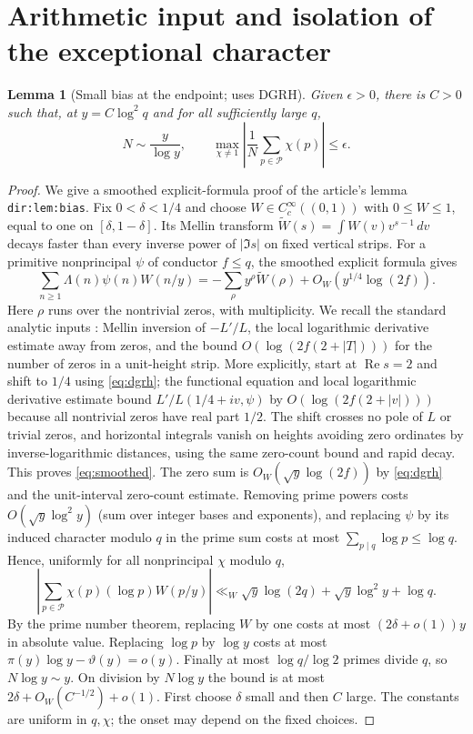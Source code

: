 \documentclass[11pt]{article}
\newtheorem{lemma}[theorem]{Lemma}
\theoremstyle{remark}\newtheorem{remark}[theorem]{Remark}
\newcommand{\Pool}{\mathcal P}
\newcommand{\abs}[1]{\left|#1\right|}
\newcommand{\Rea}{\operatorname{Re}}
\begin{document}
\section{Arithmetic input and isolation of the exceptional character}
\begin{lemma}[Small bias at the endpoint; uses DGRH]\label{lem:bias}
Given $\epsilon>0$, there is $C>0$ such that, at $y=C\log^2 q$ and for all sufficiently large $q$,
\[
 N\sim\frac{y}{\log y},\qquad
 \max_{\chi\ne1}\abs{\frac1N\sum_{p\in\Pool}\chi(p)}\le\epsilon.
\]
\end{lemma}
\begin{proof}
We give a smoothed explicit-formula proof of the article's lemma \texttt{dir:lem:bias}. Fix $0<\delta<1/4$ and choose $W\in C_c^\infty((0,1))$ with $0\le W\le1$, equal to one on $[\delta,1-\delta]$. Its Mellin transform $\widetilde W(s)=\int W(v)v^{s-1}\,dv$ decays faster than every inverse power of $|\Im s|$ on fixed vertical strips. For a primitive nonprincipal $\psi$ of conductor $f\le q$, the smoothed explicit formula gives
\begin{equation}\label{eq:smoothed}
 \sum_{n\ge1}\Lambda(n)\psi(n)W(n/y)
 =-\sum_{\rho}y^\rho\widetilde W(\rho)+O_W(y^{1/4}\log(2f)).
\end{equation}
Here $\rho$ runs over the nontrivial zeros, with multiplicity. We recall the standard analytic inputs \cite[Chs.~10, 12--13]{MV}: Mellin inversion of $-L'/L$, the local logarithmic derivative estimate away from zeros, and the bound $O(\log(2f(2+|T|)))$ for the number of zeros in a unit-height strip. More explicitly, start at $\Rea s=2$ and shift to $1/4$ using \eqref{eq:dgrh}; the functional equation and local logarithmic derivative estimate bound $L'/L(1/4+iv,\psi)$ by $O(\log(2f(2+|v|)))$ because all nontrivial zeros have real part $1/2$. The shift crosses no pole of $L$ or trivial zeros, and horizontal integrals vanish on heights avoiding zero ordinates by inverse-logarithmic distances, using the same zero-count bound and rapid decay. This proves \eqref{eq:smoothed}. The zero sum is $O_W(\sqrt y\log(2f))$ by \eqref{eq:dgrh} and the unit-interval zero-count estimate. Removing prime powers costs $O(\sqrt y\log^2 y)$ (sum over integer bases and exponents), and replacing $\psi$ by its induced character modulo $q$ in the prime sum costs at most $\sum_{p\mid q}\log p\le\log q$. Hence, uniformly for all nonprincipal $\chi$ modulo $q$,
\[
 \abs{\sum_{p\in\Pool}\chi(p)(\log p) W(p/y)}
 \ll_W \sqrt y\log(2q)+\sqrt y\log^2 y+\log q.
\]
By the prime number theorem, replacing $W$ by one costs at most $(2\delta+o(1))y$ in absolute value. Replacing $\log p$ by $\log y$ costs at most $\pi(y)\log y-\vartheta(y)=o(y)$. Finally at most $\log q/\log 2$ primes divide $q$, so $N\log y\sim y$. On division by $N\log y$ the bound is at most $2\delta+O_W(C^{-1/2})+o(1)$. First choose $\delta$ small and then $C$ large. The constants are uniform in $q,\chi$; the onset may depend on the fixed choices.
\end{proof}
\end{document}
